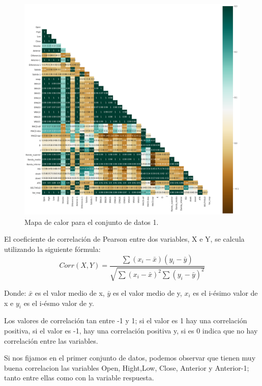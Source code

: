 \documentclass[11pt]{article} %
\begin{document}
\begin{center}
	\begin{figure}[htb]
		\centering
		\includegraphics[scale = 0.35]{medcor.png}
		\caption{Mapa de calor para el conjunto de datos 1.}
		\label{imcorr}
	\end{figure}
\end{center}




El coeficiente de correlación de Pearson entre dos variables, X e Y, se calcula utilizando la siguiente fórmula:
$$
Corr(X,Y) = \dfrac{\sum(x_i-\bar{x}) (y_i - \bar{y}) } 
{\sqrt{   \sum(x_i-\bar{x})^2 \sum (y_i - \bar{y})^2         }}
$$


Donde: $\bar{x}$ es el valor medio de x, $\bar{y}$ es el valor medio de y, $x_i$ es el i-ésimo valor de x e $y_i$ es el i-ésmo valor de y.

Los valores de correlación tan entre -1 y 1; si el valor es 1 hay una correlación positiva, si el valor es -1, hay una correlación positiva y, si es 0 indica que no hay correlación entre las variables.



Si nos fijamos en el primer conjunto de datos, podemos observar que tienen muy buena correlacion las variables Open, Hight,Low, Close, Anterior y Anterior-1; tanto entre ellas como con la variable respuesta. 
\end{document}
